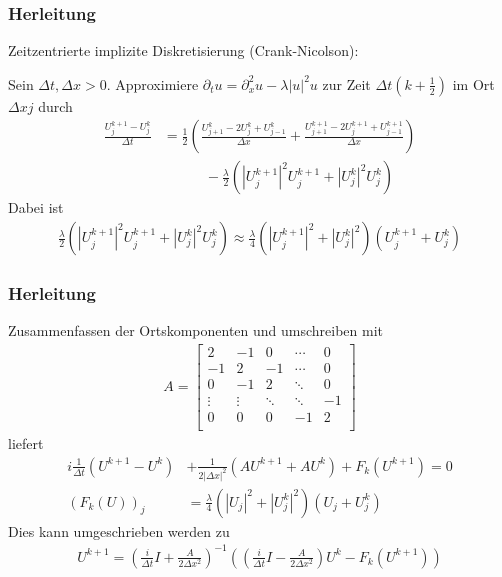 \documentclass{beamer}
\begin{document}

\begin{frame}
    \frametitle{Herleitung}

    Zeitzentrierte implizite Diskretisierung {\small(Crank-Nicolson)}:

    Sein $\Delta t, \Delta x>0$.
    Approximiere $\partial_t u = \partial_x^2 u - \lambda |u|^2u$ zur Zeit $\Delta t (k+\frac{1}{2})$ im Ort $\Delta x j$ durch
    \begin{align*}
        \frac{U^{k+1}_j-U^{k}_j}{\Delta t} &= \frac{1}{2}(\frac{U^{k}_{j+1}-2U^{k}_j+U^{k}_{j-1}}{\Delta x}+\frac{U^{k+1}_{j+1}-2U^{k+1}_j+U^{k+1}_{j-1}}{\Delta x})\\
        &\quad\qquad -\frac{\lambda}{2}(|U^{k+1}_j|^2U^{k+1}_j+|U^{k}_j|^2U^{k}_j)
    \end{align*}
    Dabei ist
    \begin{align*}
        \frac{\lambda}{2}(|U^{k+1}_j|^2U^{k+1}_j+|U^{k}_j|^2U^{k}_j) \approx \frac{\lambda}{4}(|U^{k+1}_j|^2+|U_j^k|^2)(U^{k+1}_j+U_j^k)
    \end{align*}
    

\end{frame}

\begin{frame}
    \frametitle{Herleitung}

    Zusammenfassen der Ortskomponenten und umschreiben mit 
    \begin{align*}
        A = \begin{bmatrix}
            2  & -1 &  0  &  \cdots  & 0 \\
            -1  & 2 &  -1  &  \cdots  & 0 \\
            0  & -1 &  2  &  \ddots  & 0 \\
            \vdots & \vdots & \ddots & \ddots & -1 \\
            0 & 0 & 0 & -1 & 2\\
        \end{bmatrix}
    \end{align*}
    liefert
    \begin{align*}
        i\frac{1}{\Delta t}(U^{k+1}-U^k)&+\frac{1}{2|\Delta x|^2}(AU^{k+1}+AU^k)+F_k(U^{k+1})=0\\
        (F_k(U))_j &= \frac{\lambda}{4}(|U_j|^2+|U_j^k|^2)(U_j+U_j^k)
    \end{align*}
    Dies kann umgeschrieben werden zu
    \begin{align*}
        U^{k+1} = (\frac{i}{\Delta t}I + \frac{A}{2\Delta x^2})^{-1}((\frac{i}{\Delta t}I - \frac{A}{2\Delta x^2})U^k - F_k(U^{k+1}))
    \end{align*}

\end{frame}
\end{document}
